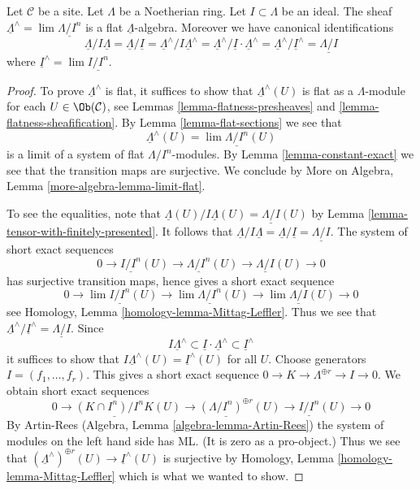 \begin{lemma}
\label{lemma-completion-flat}
Let $\mathcal{C}$ be a site. Let $\Lambda$ be a Noetherian ring.
Let $I \subset \Lambda$ be an ideal. The sheaf
$\underline{\Lambda}^\wedge = \lim \underline{\Lambda/I^n}$
is a flat $\underline{\Lambda}$-algebra.
Moreover we have canonical identifications
$$
\underline{\Lambda}/I\underline{\Lambda} =
\underline{\Lambda}/\underline{I} =
\underline{\Lambda}^\wedge/I\underline{\Lambda}^\wedge =
\underline{\Lambda}^\wedge/\underline{I} \cdot \underline{\Lambda}^\wedge =
\underline{\Lambda}^\wedge/\underline{I}^\wedge =
\underline{\Lambda/I}
$$
where $\underline{I}^\wedge = \lim \underline{I/I^n}$.
\end{lemma}

\begin{proof}
To prove $\underline{\Lambda}^\wedge$ is flat, it suffices to show that
$\underline{\Lambda}^\wedge(U)$ is flat as a $\Lambda$-module for each
$U \in \Ob(\mathcal{C})$, see
Lemmas \ref{lemma-flatness-presheaves} and
\ref{lemma-flatness-sheafification}.
By Lemma \ref{lemma-flat-sections} we see that
$$
\underline{\Lambda}^\wedge(U) = \lim \underline{\Lambda/I^n}(U)
$$
is a limit of a system of flat $\Lambda/I^n$-modules.
By Lemma \ref{lemma-constant-exact} we see that the transition maps
are surjective. We conclude by
More on Algebra, Lemma \ref{more-algebra-lemma-limit-flat}.

\medskip\noindent
To see the equalities, note that
$\underline{\Lambda}(U)/I\underline{\Lambda}(U) = \underline{\Lambda/I}(U)$
by Lemma \ref{lemma-tensor-with-finitely-presented}.
It follows that $\underline{\Lambda}/I\underline{\Lambda} =
\underline{\Lambda}/\underline{I} = \underline{\Lambda/I}$. The system
of short exact sequences
$$
0 \to \underline{I/I^n}(U) \to \underline{\Lambda/I^n}(U) \to
\underline{\Lambda/I}(U) \to 0
$$
has surjective transition maps, hence gives a short exact sequence
$$
0 \to \lim \underline{I/I^n}(U) \to \lim \underline{\Lambda/I^n}(U) \to
\lim \underline{\Lambda/I}(U) \to 0
$$
see Homology, Lemma \ref{homology-lemma-Mittag-Leffler}. Thus we see that
$\underline{\Lambda}^\wedge/\underline{I}^\wedge =
\underline{\Lambda/I}$. Since
$$
I \underline{\Lambda}^\wedge \subset
\underline{I} \cdot \underline{\Lambda}^\wedge \subset
\underline{I}^\wedge
$$
it suffices to show that
$I \underline{\Lambda}^\wedge(U) = \underline{I}^\wedge(U)$
for all $U$. Choose generators $I = (f_1, \ldots, f_r)$. This gives a
short exact sequence $0 \to K \to \Lambda^{\oplus r} \to I \to 0$.
We obtain short exact sequences
$$
0 \to \underline{(K \cap I^n)/I^nK}(U) \to
\underline{(\Lambda/I^n)^{\oplus r}}(U) \to
\underline{I/I^n}(U) \to 0
$$
By Artin-Rees (Algebra, Lemma \ref{algebra-lemma-Artin-Rees})
the system of modules on the left hand side has ML. (It is
zero as a pro-object.) Thus we see that
$(\underline{\Lambda}^\wedge)^{\oplus r}(U) \to \underline{I}^\wedge(U)$
is surjective by
Homology, Lemma \ref{homology-lemma-Mittag-Leffler}
which is what we wanted to show.
\end{proof}

